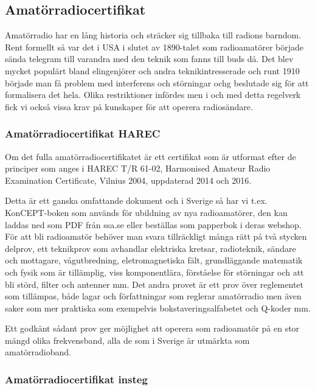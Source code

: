 \subsection{Amatörradiocertifikat}

Amatörradio har en lång historia och sträcker sig tillbaka till
radions barndom. Rent formellt så var det i USA i slutet av 1890-talet
som radioamatörer började sända telegram till varandra med den teknik
som fanns till buds då. Det blev mycket populärt bland elingenjörer
och andra teknikintresserade och runt 1910 började man få problem med
interferens och störningar ochg beslutade sig för att formalisera det
hela. Olika restriktioner infördes men i och med detta regelverk fick
vi också vissa krav på kunskaper för att operera radiosändare.

\subsubsection{Amatörradiocertifikat HAREC}

Om det fulla amatörradiocertifikatet är ett certifikat som är utformat
efter de principer som anges i HAREC T/R 61-02, Harmonised Amateur
Radio Examination Certificate, Vilnius 2004, uppdaterad 2014 och 2016.

Detta är ett ganska omfattande dokument och i Sverige så har vi t.ex.
KonCEPT-boken som används för ubildning av nya radioamatörer, den kan
laddas ned som PDF från ssa.se eller beställas som papperbok i deras
webshop. För att bli radioamatör behöver man svara tillräckligt många
rätt på två stycken delprov, ett teknikprov som avhandlar elektriska
kretsar, radioteknik, sändare och mottagare, vågutbredning,
eletromagnetiska fält, grundläggande matematik och fysik som är
tillämplig, viss komponentlära, förståelse för störningar och att bli
störd, filter och antenner mm. Det andra provet är ett prov över
reglementet som tillämpas, både lagar och författningar som reglerar
amatörradio men även saker som mer praktiska som exempelvis
bokstaveringsalfabetet och Q-koder mm.

Ett godkänt sådant prov ger möjlighet att operera som radioamatör på
en stor mängd olika frekvensband, alla de som i Sverige är utmärkta
som amatörradioband.

\subsubsection{Amatörradiocertifikat insteg}
\label{sec:instegscertifikat}

